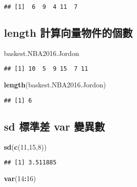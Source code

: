 \documentclass[]{article}
\newenvironment{Shaded}{\begin{snugshade}}{\end{snugshade}}
\newcommand{\DecValTok}[1]{\textcolor[rgb]{0.00,0.00,0.81}{#1}}
\newcommand{\KeywordTok}[1]{\textcolor[rgb]{0.13,0.29,0.53}{\textbf{#1}}}
\newcommand{\NormalTok}[1]{#1}
\newcommand{\OperatorTok}[1]{\textcolor[rgb]{0.81,0.36,0.00}{\textbf{#1}}}
\begin{document}
\begin{verbatim}
## [1]  6  9  4 11  7
\end{verbatim}

\hypertarget{length-ux8a08ux7b97ux5411ux91cfux7269ux4ef6ux7684ux500bux6578}{%
\subsection{length
計算向量物件的個數}\label{length-ux8a08ux7b97ux5411ux91cfux7269ux4ef6ux7684ux500bux6578}}

\begin{Shaded}
\begin{Highlighting}[]
\NormalTok{baskest.NBA2016.Jordon}
\end{Highlighting}
\end{Shaded}

\begin{verbatim}
## [1] 10  5  9 15  7 11
\end{verbatim}

\begin{Shaded}
\begin{Highlighting}[]
\KeywordTok{length}\NormalTok{(baskest.NBA2016.Jordon)}
\end{Highlighting}
\end{Shaded}

\begin{verbatim}
## [1] 6
\end{verbatim}

\hypertarget{sd-ux6a19ux6e96ux5dee-var-ux8b8aux7570ux6578}{%
\subsection{sd 標準差 var
變異數}\label{sd-ux6a19ux6e96ux5dee-var-ux8b8aux7570ux6578}}

\begin{Shaded}
\begin{Highlighting}[]
\KeywordTok{sd}\NormalTok{(}\KeywordTok{c}\NormalTok{(}\DecValTok{11}\NormalTok{,}\DecValTok{15}\NormalTok{,}\DecValTok{8}\NormalTok{))}
\end{Highlighting}
\end{Shaded}

\begin{verbatim}
## [1] 3.511885
\end{verbatim}

\begin{Shaded}
\begin{Highlighting}[]
\KeywordTok{var}\NormalTok{(}\DecValTok{14}\OperatorTok{:}\DecValTok{16}\NormalTok{)}
\end{Highlighting}
\end{Shaded}
\end{document}
